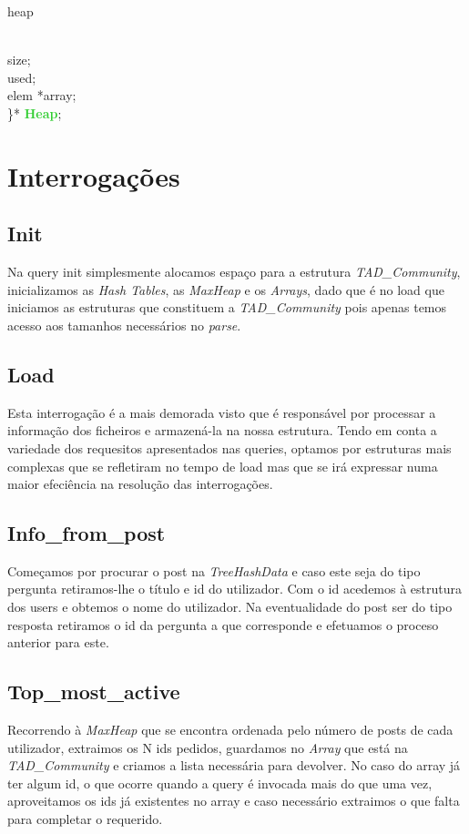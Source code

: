 \documentclass[10pt,a4paper]{article}
\begin{document}
 \noindent {\bf{\textcolor{Emerald}{typedef struct}}} heap{\\
    \indent {\bf{\textcolor{Emerald}{int}}}   size; \\
    \indent {\bf{\textcolor{Emerald}{int}}}  used; \\
    \indent elem *array;\\
\}* {\bf{\textcolor{LimeGreen}{Heap}}};\\

\section{Interrogações}
\label{sec:solucao}

\subsection{Init}
Na query init simplesmente alocamos espaço para a estrutura \textit{TAD\_Community}, inicializamos as \textit{Hash Tables}, as \textit{MaxHeap} e os \textit{Arrays}, dado que é no load que iniciamos as estruturas que constituem a \textit{TAD\_Community} pois apenas temos acesso aos tamanhos necessários no \textit{parse}.

\subsection{Load}
Esta interrogação é a mais demorada visto que é responsável por processar a informação dos ficheiros e armazená-la na nossa estrutura. Tendo em conta a variedade dos requesitos apresentados nas queries, optamos por estruturas mais complexas que se refletiram no tempo de load mas que se irá expressar numa maior efeciência na resolução das interrogações.

\subsection{Info\_from\_post}
Começamos por procurar o post na \textit{TreeHashData} e caso este seja do tipo pergunta retiramos-lhe o título e id do utilizador. Com o id acedemos à estrutura dos users e obtemos o nome do utilizador. Na eventualidade do post ser do tipo resposta retiramos o id da pergunta a que corresponde e efetuamos o proceso anterior para este.

\subsection{Top\_most\_active}
Recorrendo à \textit{MaxHeap} que se encontra ordenada pelo número de posts de cada utilizador, extraimos os N ids pedidos, guardamos no \textit{Array} que está na \textit{TAD\_Community} e criamos a lista necessária para devolver. No caso do array já ter algum id, o que ocorre quando a query é invocada mais do que uma vez, aproveitamos os ids já existentes no array e caso necessário extraimos o que falta para completar o requerido.

}
\end{document}
